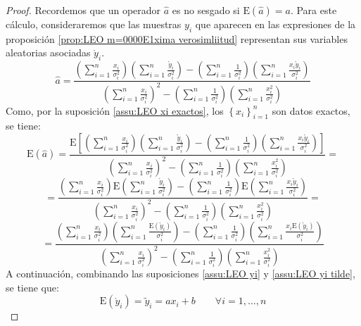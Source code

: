 \documentclass[11pt,a4paper,spanish]{article}
\numberwithin{equation}{section}
\numberwithin{table}{section}
\numberwithin{figure}{section}
\theoremstyle{definition}
\theoremstyle{remark}
\theoremstyle{definition}
\theoremstyle{remark}
\theoremstyle{plain}
\theoremstyle{plain}
\theoremstyle{plain}
\theoremstyle{plain}
\theoremstyle{plain}
\theoremstyle{plain}
\begin{document}
	\begin{proof}
		Recordemos que un operador $\hat{a}$ es no sesgado si $\mathrm{E}\left(\hat{a}\right)=a$.
		Para este cálculo, consideraremos que las muestras $y_{i}$ que aparecen
		en las expresiones de la proposición \vref{prop:LEO m=0000E1xima verosimliitud}
		representan sus variables aleatorias asociadas $\mathring{y}_{i}$.
		\[
		\hat{a}=\frac{\left(\sum_{i=1}^{n}\frac{x_{i}}{\sigma_{i}^{2}}\right)\left(\sum_{i=1}^{n}\frac{\mathring{y}_{i}}{\sigma_{i}^{2}}\right)-\left(\sum_{i=1}^{n}\frac{1}{\sigma_{i}^{2}}\right)\left(\sum_{i=1}^{n}\frac{x_{i}\mathring{y}_{i}}{\sigma_{i}^{2}}\right)}{\left(\sum_{i=1}^{n}\frac{x_{i}}{\sigma_{i}^{2}}\right)^{2}-\left(\sum_{i=1}^{n}\frac{1}{\sigma_{i}^{2}}\right)\left(\sum_{i=1}^{n}\frac{x_{i}^{2}}{\sigma_{i}^{2}}\right)}
		\]
		Como, por la suposición \vref{assu:LEO xi exactos}, los $\left\{ x_{i}\right\} _{i=1}^{n}$
		son datos exactos, se tiene:
		\[
		\mathrm{E}\left(\hat{a}\right)=\frac{\mathrm{E}\left[\left(\sum_{i=1}^{n}\frac{x_{i}}{\sigma_{i}^{2}}\right)\left(\sum_{i=1}^{n}\frac{\mathring{y}_{i}}{\sigma_{i}^{2}}\right)-\left(\sum_{i=1}^{n}\frac{1}{\sigma_{i}^{2}}\right)\left(\sum_{i=1}^{n}\frac{x_{i}\mathring{y}_{i}}{\sigma_{i}^{2}}\right)\right]}{\left(\sum_{i=1}^{n}\frac{x_{i}}{\sigma_{i}^{2}}\right)^{2}-\left(\sum_{i=1}^{n}\frac{1}{\sigma_{i}^{2}}\right)\left(\sum_{i=1}^{n}\frac{x_{i}^{2}}{\sigma_{i}^{2}}\right)}=
		\]
		\[
		=\frac{\left(\sum_{i=1}^{n}\frac{x_{i}}{\sigma_{i}^{2}}\right)\mathrm{E}\left(\sum_{i=1}^{n}\frac{\mathring{y}_{i}}{\sigma_{i}^{2}}\right)-\left(\sum_{i=1}^{n}\frac{1}{\sigma_{i}^{2}}\right)\mathrm{E}\left(\sum_{i=1}^{n}\frac{x_{i}\mathring{y}_{i}}{\sigma_{i}^{2}}\right)}{\left(\sum_{i=1}^{n}\frac{x_{i}}{\sigma_{i}^{2}}\right)^{2}-\left(\sum_{i=1}^{n}\frac{1}{\sigma_{i}^{2}}\right)\left(\sum_{i=1}^{n}\frac{x_{i}^{2}}{\sigma_{i}^{2}}\right)}=
		\]
		\[
		=\frac{\left(\sum_{i=1}^{n}\frac{x_{i}}{\sigma_{i}^{2}}\right)\left(\sum_{i=1}^{n}\frac{\mathrm{E}\left(\mathring{y}_{i}\right)}{\sigma_{i}^{2}}\right)-\left(\sum_{i=1}^{n}\frac{1}{\sigma_{i}^{2}}\right)\left(\sum_{i=1}^{n}\frac{x_{i}\mathrm{E}\left(\mathring{y}_{i}\right)}{\sigma_{i}^{2}}\right)}{\left(\sum_{i=1}^{n}\frac{x_{i}}{\sigma_{i}^{2}}\right)^{2}-\left(\sum_{i=1}^{n}\frac{1}{\sigma_{i}^{2}}\right)\left(\sum_{i=1}^{n}\frac{x_{i}^{2}}{\sigma_{i}^{2}}\right)}
		\]
		A continuación, combinando las suposiciones \vref{assu:LEO yi} y
		\vref{assu:LEO yi tilde}, se tiene que:
		\begin{equation}
			\mathrm{E}\left(\mathring{y}_{i}\right)=\tilde{y}_{i}=ax_{i}+b\qquad\forall i=1,\dots,n\label{eq:LEO E(yi)}

\end{equation}
\end{proof}
\end{document}
